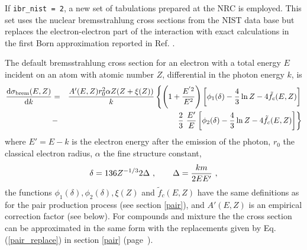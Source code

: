 \noindent
If {\tt ibr\_nist = 2}, a new set of tabulations prepared at the NRC is employed. 
This set uses the nuclear bremsstrahlung cross sections from the NIST data base \cite{SB85,SB86a} 
but replaces the electron-electron part of the interaction with exact calculations 
in the first Born approximation reported in Ref. \cite{TK08}. 

The default bremsstrahlung cross section for an electron with a 
total energy $E$ incident on an atom with atomic number $Z$, 
differential in the photon energy $k$, is
\begin{eqnarray}
\label{brems_cs}
{{\rm d} \sigma_{\rm brem}(E,Z) \over {\rm d} k} & = & {A'(E,Z) r_0^2 \alpha 
Z (Z + \xi(Z)) \over k} \left\{ \left(1 + {E^{' 2} \over E^2} \right) 
\left[ \phi_1(\delta) - \frac{4}{3} \ln Z - 4 \tilde{f}_c(E,Z) \right] 
\right. \nonumber \\ & - & \left. 
\frac{2}{3}~\frac{E'}{E} \left[\phi_2(\delta) - 
\frac{4}{3} \ln Z - 4 \tilde{f}_c(E,Z) \right]
\right\}
\end{eqnarray}
where $E' = E-k$ is the electron energy after the emission of the photon, 
$r_0$ the classical electron radius, $\alpha$ the fine structure constant, 
\begin{equation}
\delta = 136 Z^{-1/3} 2 \Delta~,\quad \quad \Delta = {k m \over 2 E E'}~,
\end{equation}
the functions $\phi_1(\delta), \phi_2(\delta), \xi(Z)$ and 
$\tilde{f}_c(E,Z)$ have the same definitions as for the 
pair production process (see section \ref{pair}),
and $A'(E,Z)$ is an empirical correction factor (see below). 
For compounds and mixture the the cross section can be 
approximated in the same form with the replacements given 
by Eq. (\ref{pair_replace}) in section \ref{pair} (page~\pageref{pair}). 


